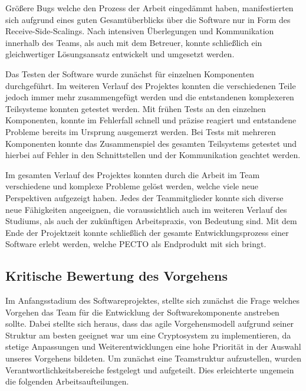 Größere Bugs welche den Prozess der Arbeit eingedämmt haben, manifestierten sich aufgrund eines guten Gesamtüberblicks über die Software nur in Form des Receive-Side-Scalings. 
Nach intensiven Überlegungen und Kommunikation innerhalb des Teams, als auch mit dem Betreuer, konnte schließlich ein gleichwertiger Lösungsansatz entwickelt und umgesetzt werden.

Das Testen der Software wurde zunächst für einzelnen Komponenten durchgeführt.
Im weiteren Verlauf des Projektes konnten die verschiedenen Teile jedoch immer mehr zusammengefügt werden und die entstandenen komplexeren Teilsysteme konnten getestet werden. 
Mit frühen Tests an den einzelnen Komponenten, konnte im Fehlerfall schnell und präzise reagiert und entstandene Probleme bereits im Ursprung ausgemerzt werden.
Bei Tests mit mehreren Komponenten konnte das Zusammenspiel des gesamten Teilsystems getestet und hierbei auf Fehler in den Schnittstellen und der Kommunikation geachtet werden.

Im gesamten Verlauf des Projektes konnten durch die Arbeit im Team verschiedene und komplexe Probleme gelöst werden, welche viele neue Perspektiven aufgezeigt haben.
Jedes der Teammitglieder konnte sich diverse neue Fähigkeiten angeeignen, die voraussichtlich auch im weiteren Verlauf des Studiums, als auch der zukünftigen Arbeitspraxis, von Bedeutung sind. 
Mit dem Ende der Projektzeit konnte schließlich der gesamte Entwicklungsprozess einer Software erlebt werden, welche PECTO als Endprodukt mit sich bringt.

\subsection{Kritische Bewertung des Vorgehens}
Im Anfangsstadium des Softwareprojektes, stellte sich zunächst die Frage welches Vorgehen das Team für die Entwicklung der Softwarekomponente anstreben sollte.
Dabei stellte sich heraus, dass das agile Vorgehensmodell aufgrund seiner Struktur am besten geeignet war um eine Cryptosystem zu implementieren, da stetige Anpassungen und Weiterentwicklungen eine hohe Priorität in der Auswahl unseres Vorgehens bildeten.
Um zunächst eine Teamstruktur aufzustellen, wurden Verantwortlichkeitsbereiche festgelegt und aufgeteilt.
Dies erleichterte ungemein die folgenden Arbeitsaufteilungen.

